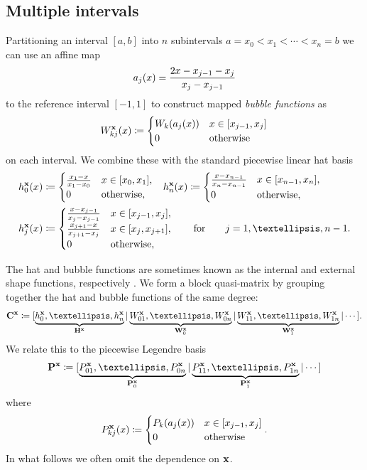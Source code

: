 \documentclass[hidelinks,onefignum,onetabnum]{siamart220329}
\def\bfP{{\bf P}}
\def\bfW{{\bf W}}
\def\bfx{{\bf x}}
\def\bfH{{\bf H}}
\def\qqfor{\qquad\hbox{for}\qquad}
\begin{document}
\subsection{Multiple intervals}
\label{sec:multiple-intervals}
Partitioning an interval $[a,b]$  into $n$ subintervals $a = x_0 < x_1 < \cdots < x_n = b$
we can use an affine map
\[
	a_j(x) = {2x - x_{j-1}  - x_j  \over x_j - x_{j-1}}
\]
to the reference interval $[-1,1]$ to  construct mapped {\it bubble functions} as
\[
W_{kj}^\bfx(x) \coloneqq \begin{cases}
	W_k(a_j(x)) & x \in [x_{j-1},x_j] \\
	0 & \hbox{otherwise}
	\end{cases}
\]
on each interval. We combine these with the standard piecewise linear hat basis
\begin{align*}
h_0^\bfx(x) &\coloneqq \begin{cases}
	{x_1 - x \over x_1 - x_0} & x \in [x_0,x_1], \\
	0 & \hbox{otherwise},
	\end{cases} \;\;\;
h_n^\bfx(x) \coloneqq \begin{cases}
	{x- x_{n-1} \over x_n - x_{n-1}} & x \in [x_{n-1},x_n], \\
	0 & \hbox{otherwise},
	\end{cases}\\
h_j^\bfx(x) &\coloneqq \begin{cases}
	{x - x_{j-1}  \over x_j - x_{j-1}} & x \in [x_{j-1},x_j], \\
	{x_{j+1}-x \over x_{j+1} - x_j} & x \in [x_j,x_{j+1}], \\
	0 & \hbox{otherwise},
	\end{cases}	\qqfor j = 1,\ldots,n-1.
\end{align*}

The hat and bubble functions are sometimes known as the internal and external shape functions, respectively \cite[Def.~3.4]{Schwab1998}. We form a block quasi-matrix by grouping together the hat  and bubble functions of the same degree:
\[
{\bf C}^\bfx \coloneqq [\underbrace{h_0^\bfx,\ldots,h_n^\bfx}_{\bfH^\bfx} | \underbrace{W_{01}^\bfx, \ldots,W_{0n}^\bfx}_{\bfW_0^\bfx} | \underbrace{W_{11}^\bfx, \ldots,W_{1n}^\bfx}_{\bfW_1^\bfx} | \cdots].
\]
We relate this to the piecewise Legendre basis
\[
\bfP^\bfx \coloneqq [\underbrace{P_{01}^\bfx, \ldots,P_{0n}^\bfx}_{\bfP_0^\bfx} | \underbrace{P_{11}^\bfx, \ldots,P_{1n}^\bfx}_{\bfP_1^\bfx} | \cdots]
\]
where
\[
P_{kj}^\bfx(x) \coloneqq \begin{cases}
	P_k(a_j(x)) & x \in [x_{j-1},x_j] \\
	0 & \hbox{otherwise}
	\end{cases}.
\]
In what follows we often omit the dependence on $\bfx$.
\end{document}

